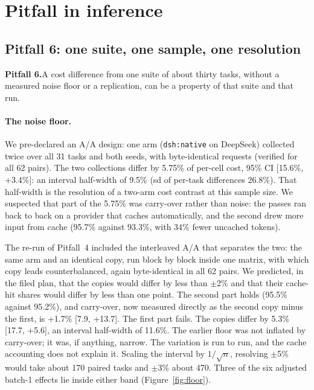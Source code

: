 \documentclass[10pt]{article}
\newcommand*{\mi}{\textminus}   %
\newenvironment{pitfall}[1]{\par\medskip\noindent\begin{lrbox}{\pitbox}\begin{minipage}{\dimexpr\linewidth-2\fboxsep-2\fboxrule\relax}\small\textbf{#1}\enskip}{\end{minipage}\end{lrbox}\fbox{\usebox{\pitbox}}\par\medskip}
\begin{document}
\section{Pitfall in inference}\label{sec:inference}

\subsection{Pitfall 6: one suite, one sample, one resolution}\label{sec:p6}

\begin{pitfall}{Pitfall 6.}A cost difference from one suite of about thirty tasks, without a measured
noise floor or a replication, can be a property of that suite and that run.\end{pitfall}

\paragraph{The noise floor.} We pre-declared an A/A design: one arm (\texttt{dsh:native} on DeepSeek)
collected twice over all 31 tasks and both seeds, with byte-identical requests (verified for all 62
pairs). The two collections differ by \mi{}5.75\% of per-cell cost, 95\% CI [\mi{}15.6\%, +3.4\%]: an
interval half-width of 9.5\% (sd of per-task differences 26.8\%). That half-width is the resolution of
a two-arm cost contrast at this sample size. We suspected that part of the \mi{}5.75\% was
carry-over rather than noise: the passes ran back to back on a provider that caches automatically,
and the second drew more input from cache (95.7\% against 93.3\%, with 34\% fewer uncached tokens).

The re-run of Pitfall~4 included the interleaved A/A that separates the two: the same arm and an
identical copy, run block by block inside one matrix, with which copy leads counterbalanced, again
byte-identical in all 62 pairs. We predicted, in the filed plan, that the copies would differ by less
than $\pm$2\% and that their cache-hit shares would differ by less than one point. The second part
holds (95.5\% against 95.2\%), and carry-over, now measured directly as the second copy minus the
first, is +1.7\% [\mi{}7.9, +13.7]. The first part fails. The copies differ by \mi{}5.3\%
[\mi{}17.7, +5.6], an interval half-width of 11.6\%. The earlier floor was not inflated by
carry-over; it was, if anything, narrow. The variation is run to run, and the cache accounting does
not explain it. Scaling the interval by $1/\sqrt{n}$, resolving $\pm$5\% would take about 170 paired tasks
and $\pm$3\% about 470. Three of the six adjusted batch-1 effects lie inside either band
(Figure~\ref{fig:floor}).
\end{document}
